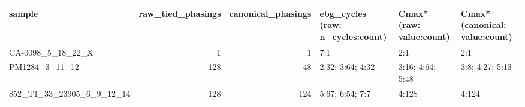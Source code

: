 \begin{tabular}{lrrlll}
\toprule
sample & raw\_tied\_phasings & canonical\_phasings & ebg\_cycles (raw: n\_cycles:count) & Cmax* (raw: value:count) & Cmax* (canonical: value:count) \\
\midrule
CA-0098\_5\_18\_22\_X & 1 & 1 & 7:1 & 2:1 & 2:1 \\
PM1284\_3\_11\_12 & 128 & 48 & 2:32; 3:64; 4:32 & 3:16; 4:64; 5:48 & 3:8; 4:27; 5:13 \\
852\_T1\_33\_23905\_6\_9\_12\_14 & 128 & 124 & 5:67; 6:54; 7:7 & 4:128 & 4:124 \\
\bottomrule
\end{tabular}
